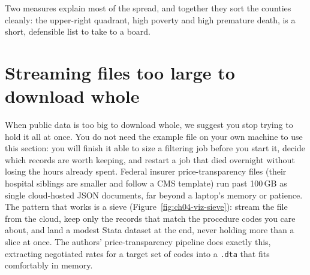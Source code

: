 \documentclass[
    a4paper,
    fontsize=10pt,
    twoside=true,
    numbers=noenddot,
]{kaobook}
\begin{document}
Two measures explain most of the spread, and together they sort the counties cleanly: the upper-right quadrant, high poverty and high premature death, is a short, defensible list to take to a board.

\section{Streaming files too large to download whole}
When public data is too big to download whole, we suggest you stop trying to hold it all at once. You do not need the example file on your own machine to use this section: you will finish it able to size a filtering job before you start it, decide which records are worth keeping, and restart a job that died overnight without losing the hours already spent. Federal insurer price-transparency files (their hospital siblings are smaller and follow a CMS template) run past 100\,GB as single cloud-hosted JSON documents, far beyond a laptop's memory or patience. The pattern that works is a sieve (Figure~\ref{fig:ch04-viz-sieve}): stream the file from the cloud, keep only the records that match the procedure codes you care about, and land a modest Stata dataset at the end, never holding more than a slice at once. The authors' price-transparency pipeline does exactly this, extracting negotiated rates for a target set of codes into a \texttt{.dta} that fits comfortably in memory.
\end{document}
